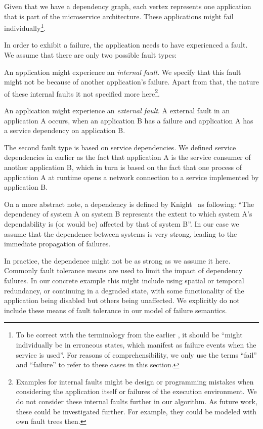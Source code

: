 Given that we have a dependency graph, each vertex represents one application that is part of the microservice architecture. These applications might fail individually\footnote{To be correct with the terminology from the earlier , it should be ``might individually be in erroneous states, which manifest as failure events when the service is used''. For reasons of comprehensibility, we only use the terms ``fail'' and ``failure'' to refer to these cases in this section.}.

In order to exhibit a failure, the application needs to have experienced a fault. We assume that there are only two possible fault types:
\begin{tenumerate}
  \item An application might experience an \emph{internal fault}. We specify that this fault might not be because of another application's failure. Apart from that, the nature of these internal faults it not specified more here\footnote{Examples for internal faults might be design or programming mistakes when considering the application itself or failures of the execution environment. We do not consider these internal faults further in our algorithm. As future work, these could be investigated further. For example, they could be modeled with own fault trees then.}.
  \item An application might experience an \emph{external fault}. A external fault in an application A occurs, when an application B has a failure and application A has a service dependency on application B.
\end{tenumerate}

The second fault type is based on service dependencies. We defined service dependencies in earlier  as the fact that application A is the service consumer of another application B, which in turn is based on the fact that one process of application A at runtime opens a network connection to a service implemented by application B.

On a more abstract note, a dependency is defined by Knight~\cite{FundamentalsDepComputing} as following: ``The dependency of system A on system B represents the extent to which system A's dependability is (or would be) affected by that of system B''. In our case we assume that the dependence between systems is very strong, leading to the immediate propagation of failures.

In practice, the dependence might not be as strong as we assume it here. Commonly fault tolerance means are used to limit the impact of dependency failures. In our concrete example this might include using spatial or temporal redundancy, or continuing in a degraded state, with some functionality of the application being disabled but others being unaffected. We explicitly do not include these means of fault tolerance in our model of failure semantics.

